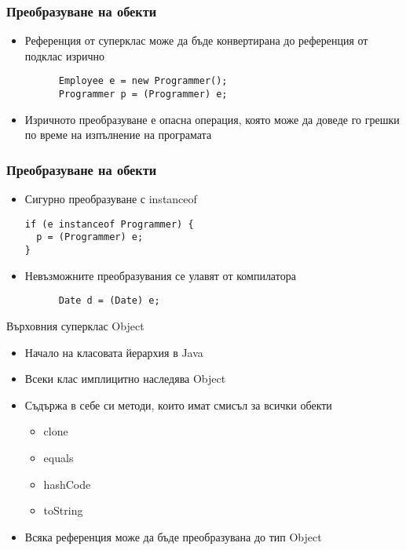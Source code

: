 \documentclass{beamer}
\begin{document}
\begin{frame}[fragile]
  \frametitle{Преобразуване на обекти}
  \transdissolve
  \begin{itemize}
  \item Референция от суперклас може да бъде конвертирана до
    референция от подклас изрично
    \begin{lstlisting}
      Employee e = new Programmer();
      Programmer p = (Programmer) e;
    \end{lstlisting}

  \item Изричното преобразуване е опасна операция, която може да
    доведе го грешки по време на изпълнение на програмата
  \end{itemize}
\end{frame}

\begin{frame}[fragile]
  \frametitle{Преобразуване на обекти}
  \transdissolve
  \begin{itemize}
  \item Сигурно преобразуване с instanceof
    \begin{lstlisting}
if (e instanceof Programmer) {
  p = (Programmer) e;
}
    \end{lstlisting}

  \item Невъзможните преобразувания се улавят от компилатора
    \begin{lstlisting}
      Date d = (Date) e;
    \end{lstlisting}

  \end{itemize}
\end{frame}

\begin{frame}{Върховния суперклас Object}
  \transdissolve
  \begin{itemize}
  \item Начало на класовата йерархия в Java
  \item Всеки клас имплицитно наследява Object
  \item Съдържа в себе си методи, които имат смисъл за всички обекти
    \begin{itemize}
      \item clone
      \item equals
      \item hashCode
      \item toString
    \end{itemize}
  \item Всяка референция може да бъде преобразувана до тип Object
  \end{itemize}
\end{frame}
\end{document}
